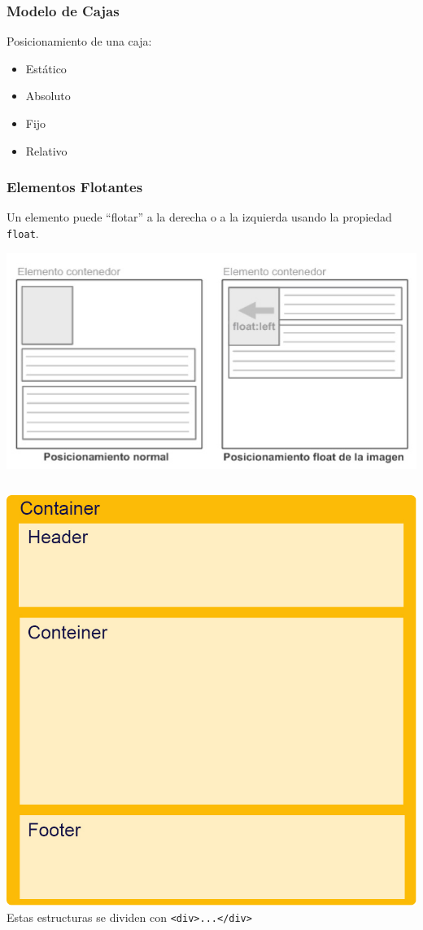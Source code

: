 \documentclass{beamer}
\begin{document}
\begin{frame} %
\frametitle{Modelo de Cajas}
	Posicionamiento de una caja:
	\begin{itemize}
	\item Estático
	\item Absoluto
	\item Fijo
	\item Relativo
	\end{itemize}
\end{frame}

\begin{frame} %
\frametitle{Elementos Flotantes}
	Un elemento puede ``flotar'' a la derecha o a la izquierda usando la propiedad {\tt float}.
	\begin{center}
	\includegraphics[scale=.5]{images/Floats.jpg} 
	\end{center}
\end{frame}

\begin{frame} %
	\begin{columns}[c]
	\includegraphics[scale=.22]{images/PruebaEstructura.jpg} 
	Estas estructuras se dividen con {\tt <div>...</div>}
	\end{columns}
\end{frame}
\end{document}
